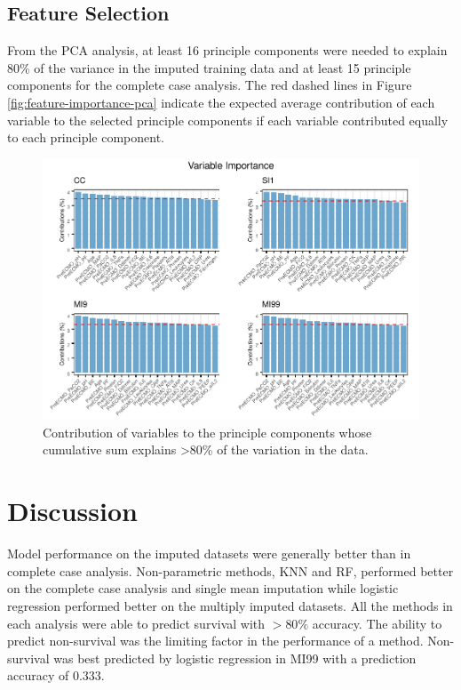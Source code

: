 \documentclass[12pt,]{article}
\begin{document}
\subsection{Feature Selection}\label{feature-selection-1}

From the PCA analysis, at least 16 principle components were needed to
explain 80\% of the variance in the imputed training data and at least
15 principle components for the complete case analysis. The red dashed
lines in Figure \ref{fig:feature-importance-pca} indicate the expected
average contribution of each variable to the selected principle
components if each variable contributed equally to each principle
component.

\begin{figure}[H]

{\centering \includegraphics[width=1\linewidth]{figure/graphics-unnamed-chunk-7-1} 

}

\caption{\label{fig:feature-importance-pca}Contribution of variables to the principle components whose cumulative sum explains >80\% of the variation in the data.}\label{fig:unnamed-chunk-7}
\end{figure}

\newpage

\section{Discussion}\label{discussion}

Model performance on the imputed datasets were generally better than in
complete case analysis. Non-parametric methods, KNN and RF, performed
better on the complete case analysis and single mean imputation while
logistic regression performed better on the multiply imputed datasets.
All the methods in each analysis were able to predict survival with
\(>80\%\) accuracy. The ability to predict non-survival was the limiting
factor in the performance of a method. Non-survival was best predicted
by logistic regression in MI99 with a prediction accuracy of \(0.333\).
\end{document}
